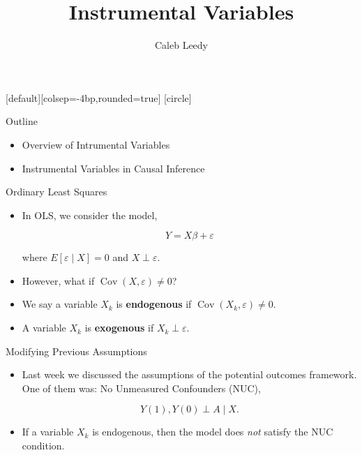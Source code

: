 \documentclass[handout]{beamer} %
\author[CL]{Caleb Leedy}
\title[IV]{Instrumental Variables}
\DeclareMathOperator*{\Cov}{Cov}
\begin{document}
\everymath{\displaystyle}
[default][colsep=-4bp,rounded=true]
[circle]
\frame{\titlepage}

\begin{frame}{Outline}

{

\begin{itemize}
    \item<1> Overview of Intrumental Variables
    \item<0> Instrumental Variables in Causal Inference
\end{itemize}
}

\end{frame}

\begin{frame}{Ordinary Least Squares}

\begin{itemize}
    \item<1-> In OLS, we consider the model,

      \begin{equation}\label{eq:ols}
      Y = X\beta + \varepsilon
      \end{equation}

      where $E[\varepsilon \mid X] = 0$ and $X \perp \varepsilon$.
    \item<2-> However, what if $\Cov(X, \varepsilon) \neq 0$?
    \item<3-> We say a variable $X_k$ is \textbf{endogenous} if $\Cov(X_k,
      \varepsilon) \neq 0$.
    \item<3-> A variable $X_k$ is \textbf{exogenous} if $X_k \perp \varepsilon$.
\end{itemize}

\end{frame}

\begin{frame}{Modifying Previous Assumptions}

\begin{itemize}
    \item Last week we discussed the assumptions of the potential outcomes
      framework. One of them was: No Unmeasured Confounders (NUC),

      \[Y(1), Y(0) \perp A \mid X.\]

    \item If a variable $X_k$ is endogenous, then the model does \textit{not} 
      satisfy the NUC condition.
\end{itemize}

\end{frame}
\end{document}
